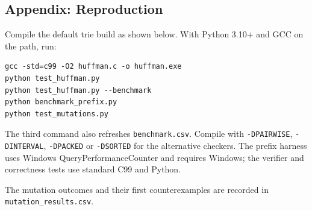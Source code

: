 \documentclass[11pt,a4paper]{article}
\begin{document}
\clearpage
\subsection*{Appendix: Reproduction}
Compile the default trie build as shown below.
With Python 3.10+ and GCC on the path, run:
\begin{verbatim}
gcc -std=c99 -O2 huffman.c -o huffman.exe
python test_huffman.py
python test_huffman.py --benchmark
python benchmark_prefix.py
python test_mutations.py
\end{verbatim}
The third command also refreshes \texttt{benchmark.csv}.
Compile with \texttt{-DPAIRWISE}, \texttt{-DINTERVAL}, \texttt{-DPACKED} or \texttt{-DSORTED} for the alternative checkers.
The prefix harness uses Windows QueryPerformanceCounter and requires Windows; the verifier and correctness tests use standard C99 and Python.

The mutation outcomes and their first counterexamples are recorded in \texttt{mutation\_results.csv}.
\end{document}

